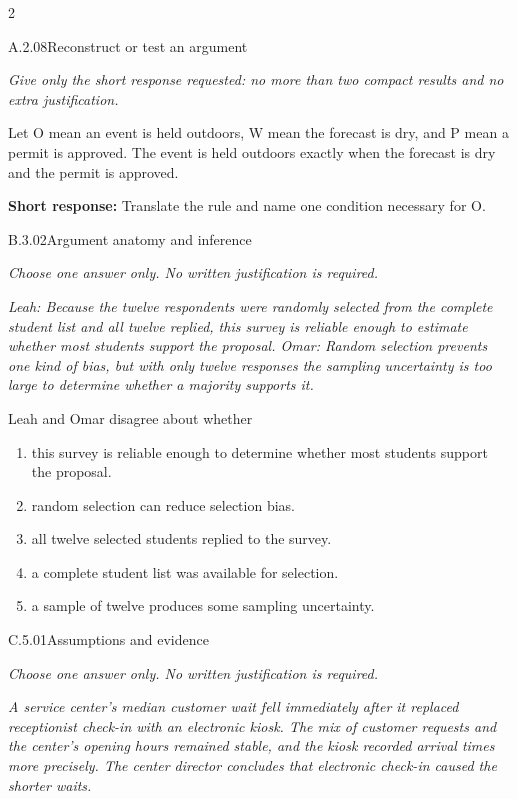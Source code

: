 \documentclass[9pt]{extarticle}
\newcommand{\choice}[1]{\item #1}
\begin{document}
\begin{multicols}{2}
\begin{DenseCoreProblem}{A.2.08}{Reconstruct or test an argument}
{\scriptsize\textit{Give only the short response requested: no more than two compact results and no extra justification.}\par}
Let O mean an event is held outdoors, W mean the forecast is dry, and P mean a permit is approved. The event is held outdoors exactly when the forecast is dry and the permit is approved.

\textbf{Short response:} Translate the rule and name one condition necessary for O.
\end{DenseCoreProblem}
\begin{DenseCoreProblem}{B.3.02}{Argument anatomy and inference}
{\scriptsize\textit{Choose one answer only. No written justification is required.}\par}
\emph{Leah: Because the twelve respondents were randomly selected from the complete student list and all twelve replied, this survey is reliable enough to estimate whether most students support the proposal. Omar: Random selection prevents one kind of bias, but with only twelve responses the sampling uncertainty is too large to determine whether a majority supports it.}

Leah and Omar disagree about whether
\begin{enumerate}[label=(\alph*)]
  \choice{this survey is reliable enough to determine whether most students support the proposal.}
  \choice{random selection can reduce selection bias.}
  \choice{all twelve selected students replied to the survey.}
  \choice{a complete student list was available for selection.}
  \choice{a sample of twelve produces some sampling uncertainty.}
\end{enumerate}
\end{DenseCoreProblem}
\columnbreak
\begin{DenseCoreProblem}{C.5.01}{Assumptions and evidence}
{\scriptsize\textit{Choose one answer only. No written justification is required.}\par}
\emph{A service center's median customer wait fell immediately after it replaced receptionist check-in with an electronic kiosk. The mix of customer requests and the center's opening hours remained stable, and the kiosk recorded arrival times more precisely. The center director concludes that electronic check-in caused the shorter waits.}


\end{DenseCoreProblem}
\end{multicols}
\end{document}
